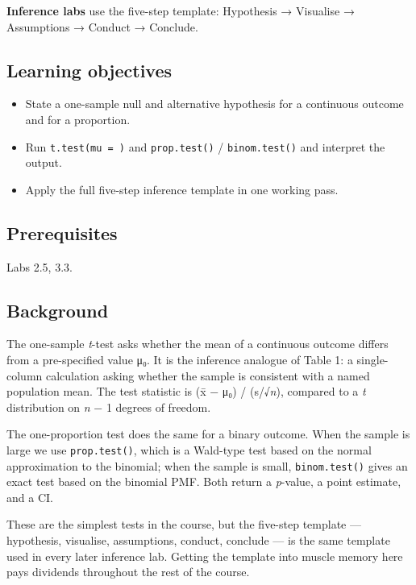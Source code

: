 \documentclass[
]{article}
\author{}
\date{\vspace{-2.5em}}
\providecommand{\tightlist}{%
  \setlength{\itemsep}{0pt}\setlength{\parskip}{0pt}}
\begin{document}
\textbf{Inference labs} use the five-step template: Hypothesis →
Visualise → Assumptions → Conduct → Conclude.

\subsection{Learning objectives}\label{learning-objectives}

\begin{itemize}
\tightlist
\item
  State a one-sample null and alternative hypothesis for a continuous
  outcome and for a proportion.
\item
  Run \texttt{t.test(mu\ =\ )} and \texttt{prop.test()} /
  \texttt{binom.test()} and interpret the output.
\item
  Apply the full five-step inference template in one working pass.
\end{itemize}

\subsection{Prerequisites}\label{prerequisites}

Labs 2.5, 3.3.

\subsection{Background}\label{background}

The one-sample \emph{t}-test asks whether the mean of a continuous
outcome differs from a pre-specified value μ₀. It is the inference
analogue of Table 1: a single-column calculation asking whether the
sample is consistent with a named population mean. The test statistic is
(x̄ − μ₀) / (s/√\emph{n}), compared to a \emph{t} distribution on
\emph{n} − 1 degrees of freedom.

The one-proportion test does the same for a binary outcome. When the
sample is large we use \texttt{prop.test()}, which is a Wald-type test
based on the normal approximation to the binomial; when the sample is
small, \texttt{binom.test()} gives an exact test based on the binomial
PMF. Both return a \emph{p}-value, a point estimate, and a CI.

These are the simplest tests in the course, but the five-step template
--- hypothesis, visualise, assumptions, conduct, conclude --- is the
same template used in every later inference lab. Getting the template
into muscle memory here pays dividends throughout the rest of the
course.
\end{document}
